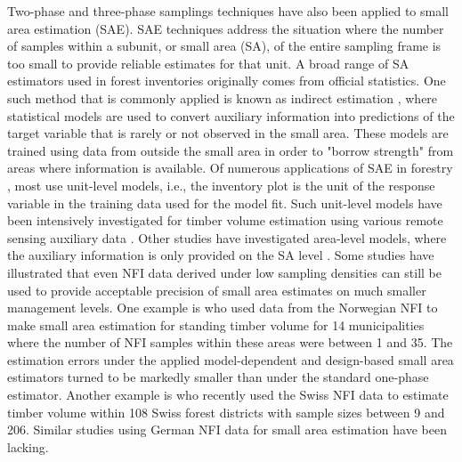 Two-phase and three-phase samplings techniques have also been applied to small area estimation (SAE). SAE techniques address the situation where the number of samples within a subunit, or small area (SA), of the entire sampling frame is too small to provide reliable estimates for that unit. A broad range of SA estimators used in forest inventories \citep{kohl2006} originally comes from official statistics. One such method that is commonly applied is known as indirect estimation \citep{rao2015}, where statistical models are used to convert auxiliary information into predictions of the target variable that is rarely or not observed in the small area. These models are trained using data from outside the small area in order to "borrow strength" from areas where information is available. Of numerous applications of SAE in forestry \citep{breidenbach2012, goerndt2011, steinmann2013, mandallaz2013b}, most use unit-level models, i.e., the inventory plot is the unit of the response variable in the training data used for the model fit. Such unit-level models have been intensively investigated for timber volume estimation using various remote sensing auxiliary data \citep{koch2010, naesset2014inmaltamo}. Other studies have investigated area-level models, where the auxiliary information is only provided on the SA level \citep{magnussen2017}. Some studies have illustrated that even NFI data derived under low sampling densities can still be used to provide acceptable precision of small area estimates on much smaller management levels. One example is \citet{breidenbach2012} who used data from the Norwegian NFI to make small area estimation for standing timber volume for 14 municipalities where the number of NFI samples within these areas were between 1 and 35. The estimation errors under the applied model-dependent and design-based small area estimators turned to be markedly smaller than under the standard one-phase estimator. Another example is \citet{magnussen2014} who recently used the Swiss NFI data to estimate timber volume within 108 Swiss forest districts with sample sizes between 9 and 206. Similar studies using German NFI data for small area estimation have been lacking.\par

